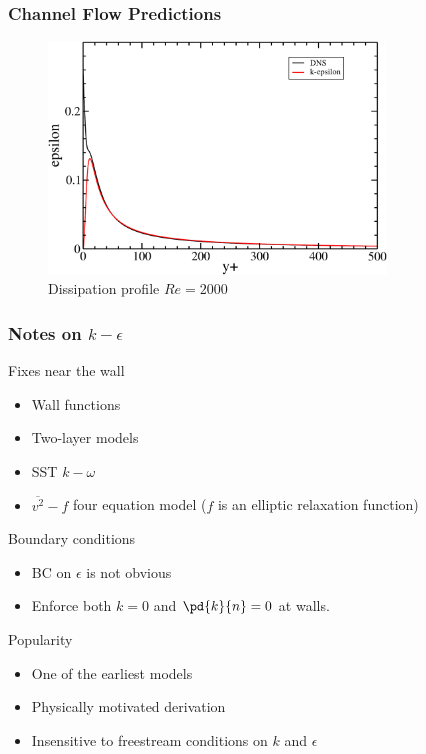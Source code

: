 \documentclass{beamer}
\begin{document}
\begin{frame}\frametitle{Channel Flow Predictions}
\begin{figure}[t]
  \begin{center}
    \includegraphics[width=0.8\textwidth]{eps2000.pdf}
  \end{center}
  \caption{Dissipation profile $Re=2000$}
\end{figure}
\end{frame}

\begin{frame}\frametitle{Notes on $k-\epsilon$}
\begin{block}{Fixes near the wall}
\begin{itemize}
	\item Wall functions
	\item Two-layer models
	\item SST $k-\omega$
	\item $\overline{v^2}-f$ four equation model ($f$ is an elliptic relaxation function)
\end{itemize}
\end{block}
\begin{block}{Boundary conditions}
\begin{itemize}
	\item BC on $\epsilon$ is not obvious
	\item Enforce both $k=0$ and $\pd{k}{n}=0$ at walls.
\end{itemize}
\end{block}
\begin{block}{Popularity}
\begin{itemize}
	\item One of the earliest models
	\item Physically motivated derivation
	\item Insensitive to freestream conditions on $k$ and $\epsilon$
\end{itemize}
\end{block}
\end{frame}
\end{document}

